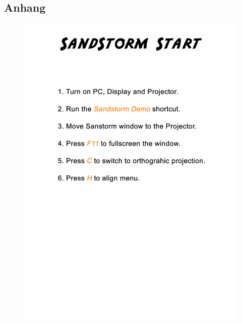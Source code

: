 \appendix
{}

\begin{Spacing}{\mylinespace}
	\setcounter{page}{1}
	\chapter{Anhang}
	
	\newpage
	\setcounter{page}{2}
	\begin{figure}[h!]
		\centering
		\vspace*{0px}
		\includegraphics[width=\columnwidth]{graphics/Start.png}
	\end{figure}	
	

\end{Spacing}
